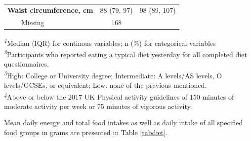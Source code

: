 \documentclass[nutrients,article,submit,moreauthors,pdftex]{Definitions/mdpi}
\begin{document}
\begin{table}[t]
\begin{tabular*}{1\linewidth}{@{\extracolsep{\fill}}lcc}
{\bfseries Waist circumference, cm} & 88 (79, 97) & 98 (89, 107) \\ 
    Missing & 168 &  \\ 
\bottomrule
\end{tabular*}
\begin{minipage}{\linewidth}
\textsuperscript{\textit{1}}Median (IQR) for continous variables; n (\%) for categorical variables\\
\textsuperscript{\textit{2}}Participants who reported eating a typical diet yesterday for all completed diet questionnaires.\\
\textsuperscript{\textit{3}}High: College or University degree;
Intermediate: A levels/AS levels, O levels/GCSEs, or equivalent;
Low: none of the previous mentioned.\\
\textsuperscript{\textit{4}}Above or below the 2017 UK Physical activity guidelines of 150 minutes of moderate activity per week or 75 minutes of vigorous activity.\\
\end{minipage}
\end{table}

Mean daily energy and total food intakes as well as daily intake of all
specified food groups in grams are presented in Table \ref{tabdiet}.
\end{document}
